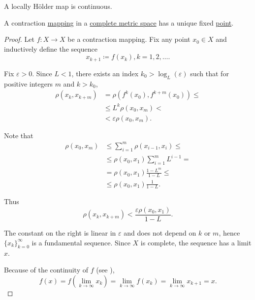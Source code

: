 \begin{Corollary}\label{thm:locally_holder_map_is_continuous}
  A locally H\"older map is continuous.
\end{Corollary}

\begin{Theorem}\label{thm:banach_fixed_point_theorem}\cite[exercise 4.3.J]{Engelking1989}
  A contraction \hyperref[def:lipschitz_continuity/contraction]{mapping} in a \hyperref[def:complete_metric_space]{complete metric space} has a unique fixed \hyperref[def:fixed_point]{point}.
\end{Theorem}
\begin{proof}
  Let \( f: X \to X \) be a contraction mapping. Fix any point \( x_0 \in X \) and inductively define the sequence
  \begin{equation*}
    x_{k+1} \coloneqq f(x_k), k = 1, 2, \ldots.
  \end{equation*}

  Fix \( \varepsilon > 0 \). Since \( L < 1 \), there exists an index \( k_0 > \log_L(\varepsilon) \) such that for positive integers \( m \) and \( k > k_0 \),
  \begin{align*}
    \rho(x_k, x_{k+m})
    &=
    \rho(f^k(x_0), f^{k+m}(x_0))
    \leq \\ &\leq
    L^k \rho(x_0, x_m)
    < \\ &<
    \varepsilon \rho(x_0, x_m).
  \end{align*}

  Note that
  \begin{align*}
    \rho(x_0, x_m)
    &\leq
    \sum_{i=1}^m \rho(x_{i-1}, x_i)
    \leq \\ &\leq
    \rho(x_0, x_1) \sum_{i=1}^m L^{i-1}
    = \\ &=
    \rho(x_0, x_1) \frac {1 - L^m} {1 - L}
    \leq \\ &\leq
    \rho(x_0, x_1) \frac 1 {1 - L}.
  \end{align*}

  Thus
  \begin{equation*}
    \rho(x_k, x_{k+m}) < \frac {\varepsilon \rho(x_0, x_1)} {1 - L}.
  \end{equation*}

  The constant on the right is linear in \( \varepsilon \) and does not depend on \( k \) or \( m \), hence \( \{ x_k \}_{k=0}^\infty \) is a fundamental sequence. Since \( X \) is complete, the sequence has a limit \( x \).

  Because of the continuity of \( f \) (see ),
  \begin{equation*}
    f(x) = f(\lim_{k \to \infty} x_k) = \lim_{k \to \infty} f(x_k) = \lim_{k \to \infty} x_{k+1} = x.
  \end{equation*}
\end{proof}

